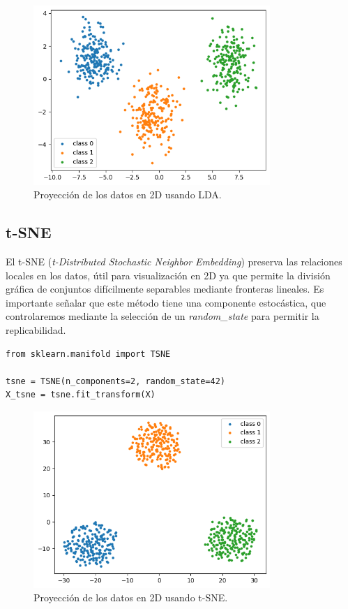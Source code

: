 \documentclass[paper=a4, fontsize=11pt]{scrartcl} %
\numberwithin{equation}{section} %
\numberwithin{figure}{section} %
\numberwithin{table}{section} %
\begin{document}
\begin{figure}[H]
\centering
\includegraphics[width=0.8\textwidth]{images/lda_projection.png}
\caption{Proyección de los datos en 2D usando LDA.}
\end{figure}

\subsection{t-SNE}
El t-SNE (\textit{t-Distributed Stochastic Neighbor Embedding})  preserva las relaciones locales en los datos, útil para visualización en 2D ya que permite la división gráfica de conjuntos difícilmente separables mediante fronteras lineales. Es importante señalar que este método tiene una componente estocástica, que controlaremos mediante la selección de un \textit{random\_state} para permitir la replicabilidad.

\begin{verbatim}
from sklearn.manifold import TSNE

tsne = TSNE(n_components=2, random_state=42)
X_tsne = tsne.fit_transform(X)
\end{verbatim}

\begin{figure}[H]
\centering
\includegraphics[width=0.8\textwidth]{images/tsne_projection.png}
\caption{Proyección de los datos en 2D usando t-SNE.}
\end{figure}
\end{document}
